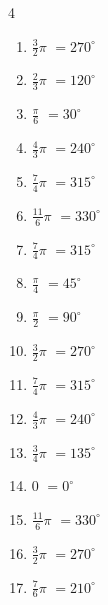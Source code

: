 \begin{multicols}{4}
\begin{enumerate}
  \item $\displaystyle \frac{3}{2}\pi$
        $\displaystyle =270^{\circ}$

  \item $\displaystyle \frac{2}{3}\pi$
        $\displaystyle =120^{\circ}$

  \item $\displaystyle \frac{\pi}{6}$
        $\displaystyle =30^{\circ}$

\columnbreak %

  \item $\displaystyle \frac{4}{3}\pi$
        $\displaystyle =240^{\circ}$

  \item $\displaystyle \frac{7}{4}\pi$
        $\displaystyle =315^{\circ}$

  \item $\displaystyle \frac{11}{6}\pi$
        $\displaystyle =330^{\circ}$

  \item $\displaystyle \frac{7}{4}\pi$
        $\displaystyle =315^{\circ}$

  \item $\displaystyle \frac{\pi}{4}$
        $\displaystyle =45^{\circ}$

  \item $\displaystyle \frac{\pi}{2}$
        $\displaystyle =90^{\circ}$

  \item $\displaystyle \frac{3}{2}\pi$
        $\displaystyle =270^{\circ}$

  \item $\displaystyle \frac{7}{4}\pi$
        $\displaystyle =315^{\circ}$

  \item $\displaystyle \frac{4}{3}\pi$
        $\displaystyle =240^{\circ}$

  \item $\displaystyle \frac{3}{4}\pi$
        $\displaystyle =135^{\circ}$

  \item $\displaystyle 0$
        $\displaystyle =0^{\circ}$

  \item $\displaystyle \frac{11}{6}\pi$
        $\displaystyle =330^{\circ}$

  \item $\displaystyle \frac{3}{2}\pi$
        $\displaystyle =270^{\circ}$

  \item $\displaystyle \frac{7}{6}\pi$
        $\displaystyle =210^{\circ}$


\end{enumerate}
\end{multicols}
